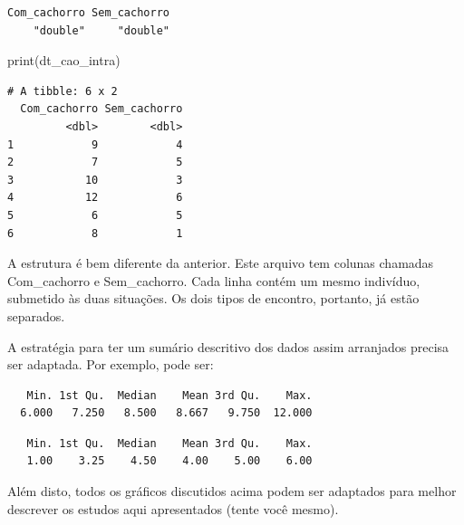 \documentclass[
]{article}
\newenvironment{Shaded}{\begin{snugshade}}{\end{snugshade}}
\newcommand{\FunctionTok}[1]{\textcolor[rgb]{0.00,0.00,0.00}{#1}}
\newcommand{\NormalTok}[1]{#1}
\newcommand{\SpecialCharTok}[1]{\textcolor[rgb]{0.00,0.00,0.00}{#1}}
\begin{document}
\begin{verbatim}
Com_cachorro Sem_cachorro 
    "double"     "double" 
\end{verbatim}

\begin{Shaded}
\begin{Highlighting}[]
\FunctionTok{print}\NormalTok{(dt\_cao\_intra)}
\end{Highlighting}
\end{Shaded}

\begin{verbatim}
# A tibble: 6 x 2
  Com_cachorro Sem_cachorro
         <dbl>        <dbl>
1            9            4
2            7            5
3           10            3
4           12            6
5            6            5
6            8            1
\end{verbatim}

A estrutura é bem diferente da anterior. Este arquivo tem colunas
chamadas Com\_cachorro e Sem\_cachorro. Cada linha contém um mesmo
indivíduo, submetido às duas situações. Os dois tipos de encontro,
portanto, já estão separados.

A estratégia para ter um sumário descritivo dos dados assim arranjados
precisa ser adaptada. Por exemplo, pode ser:

\begin{Shaded}
\end{Shaded}

\begin{verbatim}
   Min. 1st Qu.  Median    Mean 3rd Qu.    Max. 
  6.000   7.250   8.500   8.667   9.750  12.000 
\end{verbatim}

\begin{Shaded}
\end{Shaded}

\begin{verbatim}
   Min. 1st Qu.  Median    Mean 3rd Qu.    Max. 
   1.00    3.25    4.50    4.00    5.00    6.00 
\end{verbatim}

Além disto, todos os gráficos discutidos acima podem ser adaptados para
melhor descrever os estudos aqui apresentados (tente você mesmo).
\end{document}
